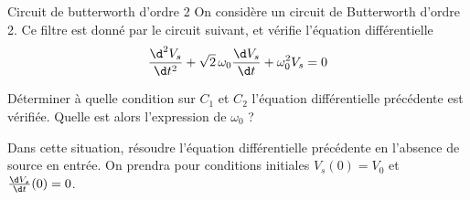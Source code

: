 \begin{exo}[PC][1][colle]{Circuit de butterworth d'ordre 2}
	On considère un circuit de Butterworth d'ordre 2. Ce filtre est donné par le circuit suivant, et vérifie l'équation différentielle 
	$$
	\frac{{\d^2V_s}}{{\d t^2}} + \sqrt{2}\,\omega_0\frac{{\d V_s}}{{\d t}} + \omega_0^2 V_s = 0
	$$
		\begin{fig}[]
			\centering
		\end{fig}
		\begin{quest}
			\item	Déterminer à quelle condition sur $C_1$ et $C_2$ l'équation différentielle précédente est vérifiée.	Quelle est alors l'expression de $\omega_0$ ?
			\item Dans cette situation, résoudre l'équation différentielle précédente en l'absence de source en entrée. On prendra pour conditions initiales $V_s(0)=V_0$ et $\frac{\d V_s}{\d t}(0)=0$.
		\end{quest}
	\end{exo}
